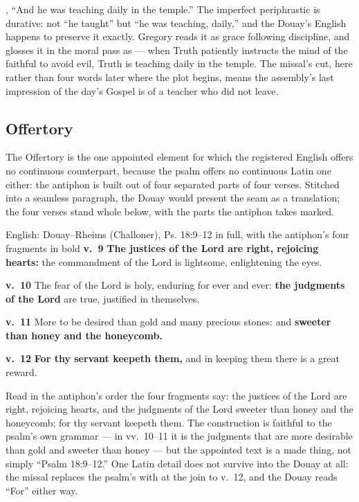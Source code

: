 , ``And he was teaching daily in the
temple.'' The imperfect periphrastic is durative: not ``he taught'' but ``he
was teaching, daily,'' and the Douay's English happens to preserve it exactly.
Gregory reads it as grace following discipline, and glosses it in the moral
pass as  --- when Truth patiently
instructs the mind of the faithful to avoid evil, Truth is teaching daily in
the temple. The missal's cut, here rather than four words later where the
plot begins, means the assembly's last impression of the
day's Gospel is of a teacher who did not leave.

\elementguard
\subsection*{Offertory }


The Offertory is the one appointed element for which the registered English
offers no continuous counterpart, because the psalm offers no continuous Latin
one either: the antiphon is built out of four separated parts of four verses.
Stitched into a seamless paragraph, the Douay would present the seam as a
translation; the four verses stand whole below, with the parts the antiphon
takes marked.

\begin{namedtranslation}{English: Douay--Rheims (Challoner), Ps. 18:9--12 in full, with the antiphon's four fragments in bold}
\textbf{v.~9} \textbf{The justices of the Lord are right, rejoicing hearts:}
the commandment of the Lord is lightsome, enlightening the eyes.

\textbf{v.~10} The fear of the Lord is holy, enduring for ever and ever:
\textbf{the judgments of the Lord} are true, justified in themselves.

\textbf{v.~11} More to be desired than gold and many precious stones: and
\textbf{sweeter than honey and the honeycomb.}

\textbf{v.~12} \textbf{For thy servant keepeth them,} and in keeping them
there is a great reward.
\end{namedtranslation}

Read in the antiphon's order the four fragments say: the justices of the Lord
are right, rejoicing hearts, and the judgments of the Lord sweeter than honey
and the honeycomb; for thy servant keepeth them. The construction is faithful
to the psalm's own grammar --- in vv.~10--11 it is the judgments that are more
desirable than gold and sweeter than honey --- but the appointed text is a
made thing, not simply ``Psalm 18:9--12.'' One Latin detail does not survive into the Douay at all: the missal
replaces the psalm's  with  at the join to v.~12,
and the Douay reads ``For'' either way.

